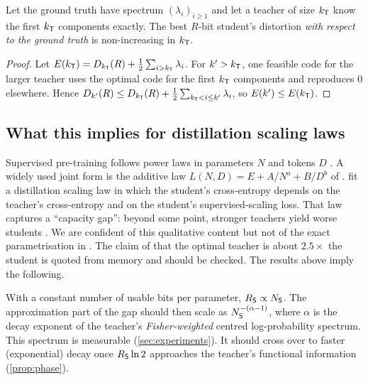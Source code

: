 \begin{proposition}\label{prop:nogap}
\Mo Let the ground truth have spectrum $(\lambda_i)_{i\ge1}$ and let a teacher of size $k_{\mathsf{T}}$ know the first
$k_{\mathsf{T}}$ components exactly. The best $R$-bit student's distortion \emph{with respect to the ground truth} is
non-increasing in $k_{\mathsf{T}}$.
\end{proposition}
\begin{proof}
Let $E(k_{\mathsf{T}})=D_{k_{\mathsf{T}}}(R)+\frac12\sum_{i>k_{\mathsf{T}}}\lambda_i$. For $k'>k_{\mathsf{T}}$, one feasible code for the larger
teacher uses the optimal code for the first $k_{\mathsf{T}}$ components and reproduces $0$ elsewhere. Hence
$D_{k'}(R)\le D_{k_{\mathsf{T}}}(R)+\frac12\sum_{k_{\mathsf{T}}<i\le k'}\lambda_i$, so $E(k')\le E(k_{\mathsf{T}})$.
\end{proof}

\subsection{What this implies for distillation scaling laws}

Supervised pre-training follows power laws in parameters $N$ and tokens $D$ \citep{kaplan2020scaling}. A
widely used joint form is the additive law $L(N,D)=E+A/N^{a}+B/D^{b}$ of \citet{hoffmann2022training}. \citet{busbridge2025distillation} fit a distillation
scaling law in which the student's cross-entropy depends on the teacher's cross-entropy and on the
student's supervised-scaling loss. That law captures a ``capacity gap'': beyond some point, stronger
teachers yield worse students \citep[see also][]{cho2019efficacy,mirzadeh2020improved,zhang2023capacity}.
We are confident of this qualitative content but not of the exact parametrisation in
\citet{busbridge2025distillation}. The claim of \citet{zhang2023capacity} that the optimal teacher is
about $2.5\times$ the student is quoted from memory and should be checked. The results above imply the
following.

\begin{heuristic}\label{heur:size}
With a constant number of usable bits per parameter, $R_{\mathsf{S}}\propto N_{\mathsf{S}}$. The approximation part of the
gap should then scale as $N_{\mathsf{S}}^{-(\alpha-1)}$, where $\alpha$ is the decay exponent of the teacher's
\emph{Fisher-weighted} centred log-probability spectrum. This spectrum is measurable (\cref{sec:experiments}).
It should cross over to faster (exponential) decay once $R_{\mathsf{S}}\ln2$ approaches the teacher's functional
information (\cref{prop:phase}).
\end{heuristic}

